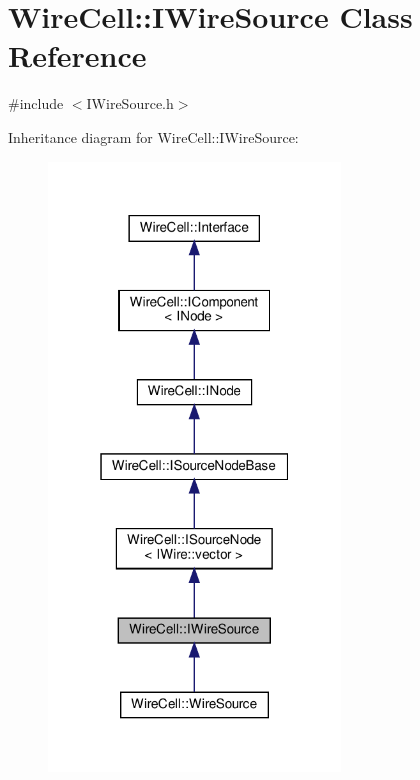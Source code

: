 \hypertarget{class_wire_cell_1_1_i_wire_source}{}\section{Wire\+Cell\+:\+:I\+Wire\+Source Class Reference}
\label{class_wire_cell_1_1_i_wire_source}


{\ttfamily \#include $<$I\+Wire\+Source.\+h$>$}



Inheritance diagram for Wire\+Cell\+:\+:I\+Wire\+Source\+:
\nopagebreak
\begin{figure}[H]
\begin{center}
\leavevmode
\includegraphics[width=220pt]{class_wire_cell_1_1_i_wire_source__inherit__graph}
\end{center}
\end{figure}


